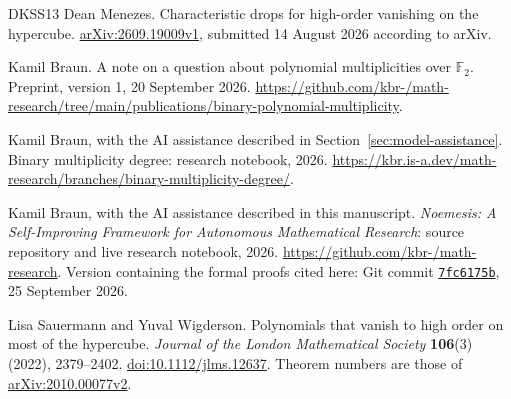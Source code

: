 \begin{thebibliography}{DKSS13}
Dean Menezes.
\newblock Characteristic drops for high-order vanishing on the hypercube.
\newblock \href{https://arxiv.org/abs/2609.19009v1}{arXiv:2609.19009v1},
submitted 14 August 2026 according to arXiv.

Kamil Braun.
\newblock A note on a question about polynomial multiplicities over \(\mathbb F_2\).
\newblock Preprint, version 1, 20 September 2026.
\newblock \url{https://github.com/kbr-/math-research/tree/main/publications/binary-polynomial-multiplicity}.

Kamil Braun, with the AI assistance described in Section~\ref{sec:model-assistance}.
\newblock Binary multiplicity degree: research notebook, 2026.
\newblock \url{https://kbr.is-a.dev/math-research/branches/binary-multiplicity-degree/}.

Kamil Braun, with the AI assistance described in this manuscript.
\newblock \emph{Noemesis: A Self-Improving Framework for Autonomous Mathematical
Research}: source repository and live research notebook, 2026.
\newblock \url{https://github.com/kbr-/math-research}.
\newblock Version containing the formal proofs cited here: Git commit
\href{https://github.com/kbr-/math-research/tree/7fc6175b92fd064c488eca76eba2b04522da7815}
{\texttt{7fc6175b}}, 25 September 2026.

Lisa Sauermann and Yuval Wigderson.
\newblock Polynomials that vanish to high order on most of the hypercube.
\newblock \emph{Journal of the London Mathematical Society} \textbf{106}(3)
(2022), 2379--2402.
\newblock \href{https://doi.org/10.1112/jlms.12637}{doi:10.1112/jlms.12637}.
Theorem numbers are those of
\href{https://arxiv.org/abs/2010.00077v2}{arXiv:2010.00077v2}.

\end{thebibliography}
